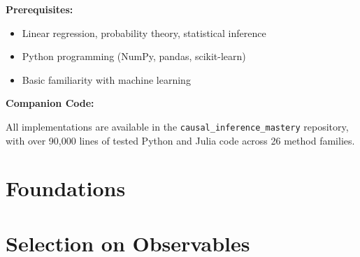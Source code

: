 \documentclass[11pt,oneside]{amsbook}
\theoremstyle{definition}
\theoremstyle{plain}
\theoremstyle{remark}
\begin{document}
\textbf{Prerequisites:}
\begin{itemize}
    \item Linear regression, probability theory, statistical inference
    \item Python programming (NumPy, pandas, scikit-learn)
    \item Basic familiarity with machine learning
\end{itemize}

\textbf{Companion Code:}

All implementations are available in the \texttt{causal\_inference\_mastery} repository, with over 90,000 lines of tested Python and Julia code across 26 method families.


\mainmatter


\part{Foundations}
\label{part:foundations}






\part{Selection on Observables}
\label{part:selection_observables}







\end{document}
